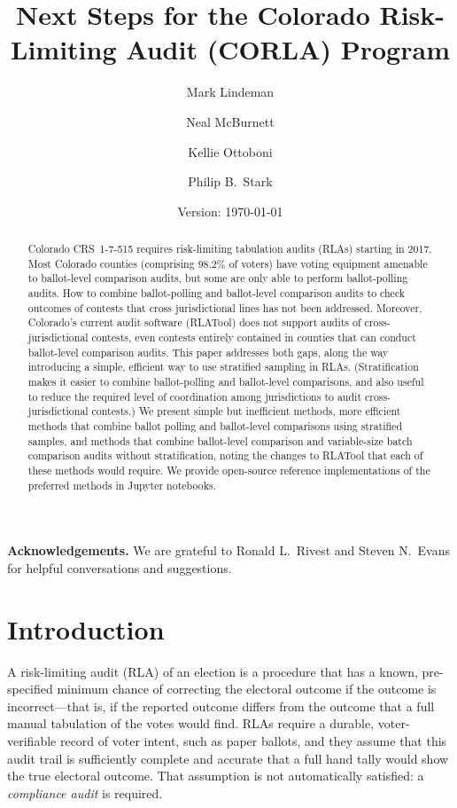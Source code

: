 \documentclass[runningheads]{llncs}
\title{Next Steps for the Colorado Risk-Limiting Audit (CORLA) Program}
\author{
   Mark Lindeman\inst{1}\orcidID{x} \and
   Neal McBurnett\inst{2}\orcidID{0000-0001-8667-1830} \and
   Kellie Ottoboni\inst{3}\orcidID{0000-0002-9107-3402} \and
   Philip B.~Stark\inst{3}\orcidID{0000-0002-3771-9604}
}
\institute{Mark's affiliation \and
Neal's affiliation \and
Department of Statistics, University of California, Berkeley, CA, USA}
\date{Version: \today}
\begin{document}
\maketitle


\begin{abstract}
Colorado CRS~1-7-515 requires risk-limiting tabulation audits (RLAs) starting in 2017.
Most Colorado counties (comprising 98.2\% of voters) have voting equipment amenable to ballot-level comparison audits, but some
are only able to perform ballot-polling audits. 
How to combine ballot-polling and ballot-level comparison audits to check outcomes of contests that cross jurisdictional lines has not been addressed.
Moreover, Colorado's current audit software (RLATool) does not support audits of cross-jurisdictional contests, even contests entirely
contained in counties that can conduct ballot-level comparison audits. 
This paper addresses both gaps, along the way introducing a simple, efficient way to use 
stratified sampling in RLAs.
(Stratification makes it easier to combine ballot-polling and ballot-level comparisons, and also useful to reduce the
required level of coordination among jurisdictions to audit cross-jurisdictional contests.)
We present simple but inefficient methods, more efficient methods
that combine ballot polling and ballot-level comparisons using stratified samples,
and methods that combine ballot-level comparison and
variable-size batch comparison audits without stratification,
noting the changes to RLATool that each of these methods would require.
We provide open-source reference implementations of the preferred methods in Jupyter notebooks.
\end{abstract}

\noindent
\textbf{Acknowledgements.}
We are grateful to Ronald L.~Rivest and Steven N.~Evans for helpful conversations and suggestions.

\section{Introduction}
A risk-limiting audit (RLA) of an election is a procedure that
has a known, pre-specified minimum chance of correcting the electoral outcome if the outcome
is incorrect---that is, if the reported outcome differs from the outcome that a full manual
tabulation of the votes would find. 
RLAs require a durable, voter-verifiable record of voter intent, such as paper ballots,
and they assume that this audit trail is sufficiently complete and accurate that a full hand
tally would show the true electoral outcome.
That assumption is not automatically satisfied: a \emph{compliance audit}
\cite{starkWagner12} 
is required.
\end{document}
